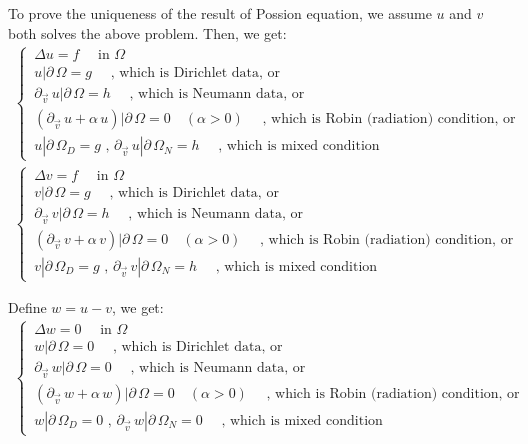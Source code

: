 \documentclass[../main.tex]{subfiles}
\begin{document}
To prove the uniqueness of the result of Possion equation, we assume $u$ and $v$ both solves the above problem. Then, we get:
\begin{align}
    \begin{cases} \label{eq:LE16}
        \, \Delta u = f \quad \text{ in  } \Omega \\
        \, u|\partial \, \Omega = g \quad \text{ , which is Dirichlet data, or  } \\
        \, \partial_{\vec{v}} \, u|\partial \, \Omega = h \quad \text{ , which is Neumann data, or  } \\
        \, (\partial_{\vec{v}} \, u + \alpha \, u)|\partial \, \Omega  = 0 \quad (\alpha > 0) \quad \text{ , which is Robin (radiation) condition, or  } \\
        \, u|\partial \, \Omega_D = g \text{ ,  } \partial_{\vec{v}} \, u|\partial \, \Omega_N = h \quad \text{ , which is mixed condition  }
    \end{cases} \\
    \begin{cases} \label{eq:LE17}
        \, \Delta v = f \quad \text{ in  } \Omega \\
        \, v|\partial \, \Omega = g \quad \text{ , which is Dirichlet data, or  } \\
        \, \partial_{\vec{v}} \, v|\partial \, \Omega = h \quad \text{ , which is Neumann data, or  } \\
        \, (\partial_{\vec{v}} \, v + \alpha \, v)|\partial \, \Omega  = 0 \quad (\alpha > 0) \quad \text{ , which is Robin (radiation) condition, or  } \\
        \, v|\partial \, \Omega_D = g \text{ ,  } \partial_{\vec{v}} \, v|\partial \, \Omega_N = h \quad \text{ , which is mixed condition  }
    \end{cases}
\end{align}

Define $w = u - v$, we get:
\begin{align}
    \begin{cases} \label{eq:LE18}
        \, \Delta w = 0 \quad \text{ in  } \Omega \\
        \, w|\partial \, \Omega = 0 \quad \text{ , which is Dirichlet data, or  } \\
        \, \partial_{\vec{v}} \, w|\partial \, \Omega = 0 \quad \text{ , which is Neumann data, or  } \\
        \, (\partial_{\vec{v}} \, w + \alpha \, w)|\partial \, \Omega  = 0 \quad (\alpha > 0) \quad \text{ , which is Robin (radiation) condition, or  } \\
        \, w|\partial \, \Omega_D = 0 \text{ ,  } \partial_{\vec{v}} \, w|\partial \, \Omega_N = 0 \quad \text{ , which is mixed condition  }
    \end{cases}
\end{align}
\end{document}
